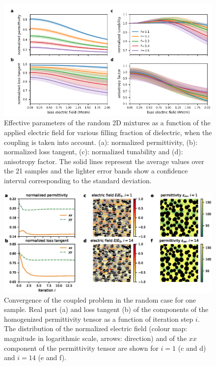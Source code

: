 \documentclass[openacc]{rsproca_new}%
\begin{document}
\begin{figure}[!t]
 \centering
 \includegraphics[width=1\textwidth]{effpar_rand_cpl}
 \caption{Effective parameters of the random 2D mixtures as a function of the
  applied electric field for various filling fraction of dielectric, when the
  coupling is taken into account.
  (a): normalized permittivity, (b): normalized loss tangent, (c): normalized tunability and
  (d): anisotropy factor. The solid lines represent the average values
  over the 21 samples and the lighter error bands show a confidence interval corresponding to
  the standard deviation.}
 \label{eff_par_2Drand_TM}
\end{figure}
%
%
%
\begin{figure}[!t]
 \centering
 \includegraphics[width=1\textwidth]{conv_rand}
 \caption{Convergence of the coupled problem in the random case
  for one sample.
  Real part (a) and loss tangent (b) of the components of the homogenized
  permittivity tensor as a function of iteration step $i$. The distribution of
  the normalized electric field (colour map: magnitude in logarithmic scale, arrows: direction) and of the
  $xx$ component of the permittivity tensor are shown for $i=1$
  (c and d) and $i=14$ (e and f).
 }
 \label{conv_random}
\end{figure}
\end{document}
